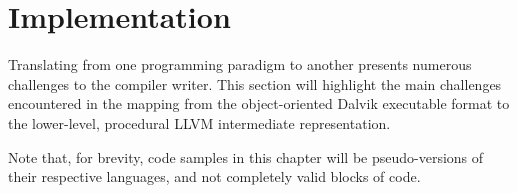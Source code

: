 \chapter{Implementation}
\label{chap:implementation}

Translating from one programming paradigm to another presents numerous challenges to the compiler writer. This section will highlight the main challenges encountered in the mapping from the object-oriented Dalvik executable format to the lower-level, procedural LLVM intermediate representation.

Note that, for brevity, code samples in this chapter will be pseudo-versions of their respective languages, and not completely valid blocks of code.















%

%

%
